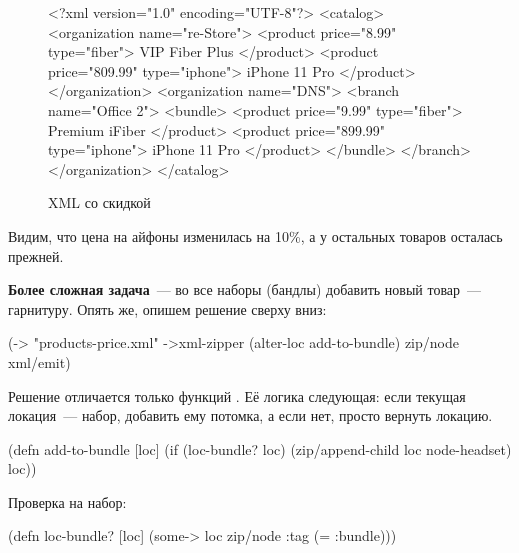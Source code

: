 \begin{figure}[ht!]

\begin{english}
  \begin{xml}
<?xml version="1.0" encoding="UTF-8"?>
<catalog>
  <organization name="re-Store">
    <product price="8.99" type="fiber">
      VIP Fiber Plus
    </product>
    <product price="809.99" type="iphone">
      iPhone 11 Pro
    </product>
  </organization>
  <organization name="DNS">
    <branch name="Office 2">
      <bundle>
        <product price="9.99" type="fiber">
          Premium iFiber
        </product>
        <product price="899.99" type="iphone">
          iPhone 11 Pro
        </product>
      </bundle>
    </branch>
  </organization>
</catalog>
  \end{xml}
\end{english}

\caption{XML со скидкой}
\label{fig:chart-xml-02}

\end{figure}

Видим, что цена на айфоны изменилась на 10\%, а у остальных товаров осталась
прежней.

\textbf{Более сложная задача}~--- во все наборы (бандлы) добавить новый товар~---
гарнитуру. Опять же, опишем решение сверху вниз:

\begin{english}
  \begin{clojure}
(-> "products-price.xml"
    ->xml-zipper
    (alter-loc add-to-bundle)
    zip/node
    xml/emit)
  \end{clojure}
\end{english}

Решение отличается только функций . Её логика следующая: если
текущая локация~--- набор, добавить ему потомка, а если нет, просто вернуть
локацию.

\begin{english}
  \begin{clojure}
(defn add-to-bundle [loc]
  (if (loc-bundle? loc)
    (zip/append-child loc node-headset)
    loc))
  \end{clojure}
\end{english}

Проверка на набор:

\begin{english}
  \begin{clojure}
(defn loc-bundle? [loc]
  (some-> loc zip/node :tag (= :bundle)))
  \end{clojure}
\end{english}

